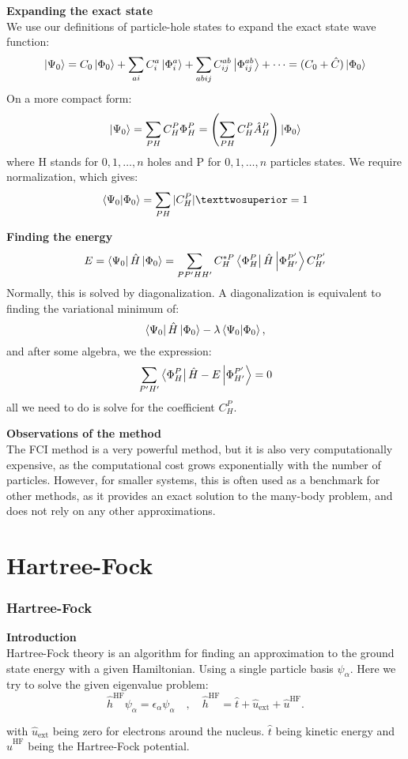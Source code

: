 \documentclass[UKenglish,aspectratio=169,12pt]{beamer}
\begin{document}
\begin{frame}
    \textbf{Expanding the exact state}\\
    We use our definitions of particle-hole states to expand the exact state wave function:
    \[
    \ket{\Psi_0} = C_0 \ket{\Phi_0} + \sum_{ai} C_i ^a \ket{\Phi_i ^a } + \sum_{abij}C_{ij}^{ab} \ket{ \Phi_{ij}^{ab}} + \dots = (C_0 + \hat{C} )\ket{\Phi_0}
    \]
    On a more compact form:
    \[
        \ket{\Psi_0} = \sum_{PH} C_H^P \Phi_H^P = \left( \sum_{PH} C_H^P \hat{A}_H^P \right)\ket{\Phi_0} 
    \]
    where H stands for $0,1,\dots,n$ holes and P for $0,1,\dots,n$ particles states. We require normalization, which gives:
    \[
        \bra{  \Psi_0} \ket{\Phi_0} = \sum_{PH} | C_H^P |² = 1 
    \]
\end{frame}

\begin{frame}
    \textbf{Finding the energy}\\
    \[
        E = \bra{ \Psi_0} \hat{H} \ket{\Phi_0} = \sum_{PP' H H'} C^{*P}_H  \bra{ \Phi_H^P } \hat{H} \ket{ \Phi_{H'}^{P'}}C_{H'}^{P'}
    \]
    Normally, this is solved by diagonalization.  A diagonalization is equivalent to finding the variational minimum of:
    \[
        \bra{ \Psi_0} \hat{H} \ket{\Phi_0} - \lambda \bra{ \Psi_0} \ket{ \Phi_0},
    \]
    and after some algebra, we the expression:
    \[
        \sum_{P'H'} \bra{ \Phi_H^P} \hat{H} - E \ket{ \Phi_{H'}^{P'}} = 0
    \]
    all we need to do is solve for the coefficient $C_H^P$.
\end{frame}

\begin{frame}
    \textbf{Observations of the method}\\
    The FCI method is a very powerful method, but it is also very computationally expensive, as the computational cost grows exponentially with the number of particles. However, for smaller systems, this is often used as a benchmark for other methods, as it provides an exact solution to the many-body problem, and does not rely on any other approximations.
\end{frame}

\section{Hartree-Fock}

\begin{frame}
    \frametitle{Hartree-Fock}
    \textbf{Introduction}\\
    Hartree-Fock theory is an algorithm for finding an approximation to the ground state energy with a given Hamiltonian. Using a single particle basis $\psi_\alpha$. Here we try to solve the given eigenvalue problem:
    \[
        \hat{h}^{\text{HF}}\psi_{\alpha} = \epsilon_{\alpha}\psi_{\alpha} \quad , \quad \hat{h}^{\text{HF}} = \hat{t} + \hat{u}_{\text{ext}} + \hat{u}^{\text{HF}}.
    \]

    with $\hat{u}_{\text{ext}}$ being zero for electrons around the nucleus. $\hat{t}$ being kinetic energy and $\hat{u}^{\text{HF}}$ being the Hartree-Fock potential.
\end{frame}
\end{document}
